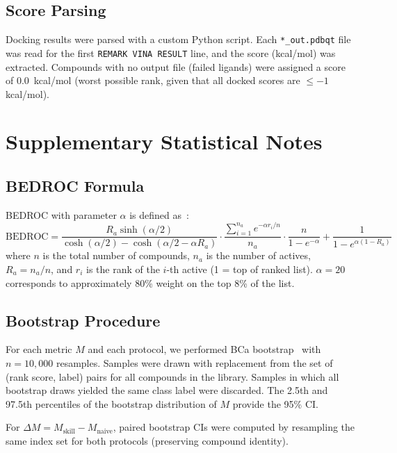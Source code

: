 \documentclass[11pt,a4paper]{article}
\begin{document}
\subsection{Score Parsing}

Docking results were parsed with a custom Python script. Each \texttt{*\_out.pdbqt} file was read for the first \texttt{REMARK VINA RESULT} line, and the score (kcal/mol) was extracted. Compounds with no output file (failed ligands) were assigned a score of 0.0~kcal/mol (worst possible rank, given that all docked scores are $\leq -1$ kcal/mol).

\section{Supplementary Statistical Notes}

\subsection{BEDROC Formula}

BEDROC with parameter $\alpha$ is defined as~\citep{bedroc2007}:
\begin{equation}
  \text{BEDROC} = \frac{R_a \sinh(\alpha/2)}{\cosh(\alpha/2) - \cosh(\alpha/2 - \alpha R_a)} \cdot
    \frac{\sum_{i=1}^{n_a} e^{-\alpha r_i / n}}{n_a} \cdot
    \frac{n}{1 - e^{-\alpha}} + \frac{1}{1 - e^{\alpha(1-R_a)}}
\end{equation}
where $n$ is the total number of compounds, $n_a$ is the number of actives, $R_a = n_a/n$, and $r_i$ is the rank of the $i$-th active (1 = top of ranked list). $\alpha = 20$ corresponds to approximately 80\% weight on the top 8\% of the list.

\subsection{Bootstrap Procedure}

For each metric $M$ and each protocol, we performed BCa bootstrap~\citep{bh1995} with $n = 10{,}000$ resamples. Samples were drawn with replacement from the set of (rank score, label) pairs for all compounds in the library. Samples in which all bootstrap draws yielded the same class label were discarded. The 2.5th and 97.5th percentiles of the bootstrap distribution of $M$ provide the 95\% CI.

For $\Delta M = M_\text{skill} - M_\text{naive}$, paired bootstrap CIs were computed by resampling the same index set for both protocols (preserving compound identity).
\end{document}

